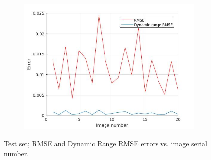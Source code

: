 \documentclass[a4paper]{iacas}
\begin{document}
\begin{figure}[!htbp]
	\centering
	\begin{subfigure}[b]{0.5\textwidth}
		\includegraphics[width=\textwidth]{410.jpg}
		\label{fig:410}
	\end{subfigure}
	
	\caption{Test set; RMSE and Dynamic Range RMSE errors vs. image serial number.}
	\label{fig:400}
\end{figure}
\end{document}
